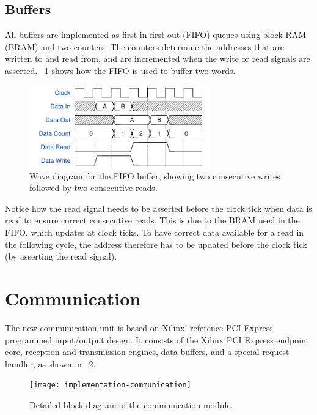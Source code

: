 \subsection{Buffers}

All buffers are implemented as first-in first-out (FIFO) queues using block RAM (BRAM) and two counters.
The counters determine the addresses that are written to and read from, and are incremented when the write or read signals are asserted.
\figurename~\ref{fig:wavediagram-fifo} shows how the FIFO is used to buffer two words.

\begin{figure}[!ht]
    \centering
    \includegraphics[width=0.7\textwidth]{figures/wavediagram-fifo}
    \caption[FIFO buffer wave diagram]{
        Wave diagram for the FIFO buffer, showing two consecutive writes followed by two consecutive reads.
    }
    \label{fig:wavediagram-fifo}
\end{figure}

Notice how the read signal needs to be asserted before the clock tick when data is read to ensure correct consecutive reads.
This is due to the BRAM used in the FIFO, which updates at clock ticks.
To have correct data available for a read in the following cycle, the address therefore has to be updated before the clock tick (by asserting the read signal).


\section{Communication}

The new communication unit is based on Xilinx' reference PCI Express programmed input/output design.
It consists of the Xilinx PCI Express endpoint core, reception and transmission engines, data buffers, and a special request handler, as shown in \figurename~\ref{fig:implementation-communication}.

\begin{figure}[!ht]
    \centering
    \texttt{[image: implementation-communication]}
    \caption[Communication module]{
        Detailed block diagram of the communication module.
    }
    \label{fig:implementation-communication}
\end{figure}

